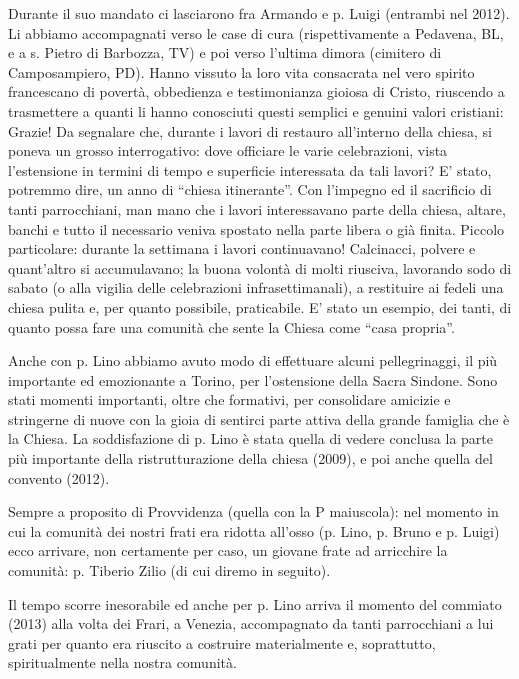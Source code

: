 Durante il suo mandato ci lasciarono fra Armando e p. Luigi (entrambi nel 2012). Li 
abbiamo accompagnati verso le case di cura (rispettivamente a Pedavena, BL, e a s. Pietro di 
Barbozza, TV) e poi verso l’ultima dimora (cimitero di Camposampiero, PD). Hanno vissuto la loro vita consacrata nel vero spirito 
francescano di povertà, obbedienza e testimonianza gioiosa di Cristo, riuscendo a trasmettere a 
quanti li hanno conosciuti questi semplici e genuini valori cristiani: Grazie!
Da segnalare che, durante i lavori di restauro all’interno della chiesa, si poneva un grosso 
interrogativo: dove officiare le varie celebrazioni, vista l’estensione in termini di tempo e superficie 
interessata da tali lavori? E’ stato, potremmo dire, un anno di “chiesa itinerante”. Con l’impegno ed 
il sacrificio di tanti parrocchiani, man mano che i lavori interessavano parte della chiesa, altare, 
banchi e tutto il necessario veniva spostato nella parte libera o già finita. 
Piccolo particolare: durante la settimana i lavori continuavano! Calcinacci, polvere e quant’altro si 
accumulavano; la buona volontà di molti riusciva, lavorando sodo di sabato (o alla vigilia delle 
celebrazioni infrasettimanali), a restituire ai fedeli una chiesa pulita e, per quanto possibile, 
praticabile. E’ stato un esempio, dei tanti, di quanto possa fare una comunità che sente la Chiesa 
come “casa propria”.

Anche con p. Lino abbiamo avuto modo di effettuare alcuni pellegrinaggi, il più importante 
ed emozionante a Torino, per l’ostensione della Sacra Sindone. Sono stati momenti importanti, oltre 
che formativi, per consolidare amicizie e stringerne di nuove con la gioia di sentirci parte attiva 
della grande famiglia che è la Chiesa. 
La soddisfazione di p. Lino è stata quella di vedere conclusa la parte più importante della 
ristrutturazione della chiesa (2009), e poi anche quella del convento (2012).

Sempre a proposito di Provvidenza (quella con la P maiuscola): nel momento in cui la 
comunità dei nostri frati era ridotta all’osso (p. Lino, p. Bruno e p. Luigi) ecco arrivare, non 
certamente per caso, un giovane frate ad arricchire la comunità: p. Tiberio Zilio (di cui diremo in 
seguito).

Il tempo scorre inesorabile ed anche per p. Lino arriva il momento del commiato (2013) alla volta 
dei Frari, a Venezia, accompagnato da tanti parrocchiani a lui grati per quanto era riuscito a 
costruire materialmente e, soprattutto, spiritualmente nella nostra comunità. 

